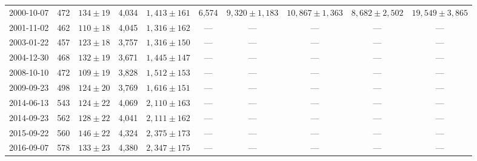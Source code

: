 \begin{landscape}
\begin{longtable}{cccccccccc}
{2000-10-07} & 472 & {$134  \pm  19$} & 4,034 & {$1,413 \pm 161$} & 6,574 & {$9,320 \pm 1,183$} & {$10,867 \pm 1,363$} & {$8,682 \pm 2,502$} & {$19,549 \pm 3,865$} \\
{2001-11-02} & 462 & {$110  \pm  18$} & 4,045 & {$1,316 \pm 162$} & --- & --- & --- & --- & --- \\
{2003-01-22} & 457 & {$123  \pm  18$} & 3,757 & {$1,316 \pm 150$} & --- & --- & --- & --- & --- \\
{2004-12-30} & 468 & {$132  \pm  19$} & 3,671 & {$1,445 \pm 147$} & --- & --- & --- & --- & --- \\
{2008-10-10} & 472 & {$109  \pm  19$} & 3,828 & {$1,512 \pm 153$} & --- & --- & --- & --- & --- \\
{2009-09-23} & 498 & {$124  \pm  20$} & 3,769 & {$1,616 \pm 151$} & --- & --- & --- & --- & --- \\
{2014-06-13} & 543 & {$124  \pm  22$} & 4,069 & {$2,110 \pm 163$} & --- & --- & --- & --- & --- \\
{2014-09-23} & 562 & {$128  \pm  22$} & 4,041 & {$2,111 \pm 162$} & --- & --- & --- & --- & --- \\
{2015-09-22} & 560 & {$146  \pm  22$} & 4,324 & {$2,375 \pm 173$} & --- & --- & --- & --- & --- \\
{2016-09-07} & 578 & {$133  \pm  23$} & 4,380 & {$2,347 \pm 175$} & --- & --- & --- & --- & --- \\
\end{longtable} 
\end{landscape} 
